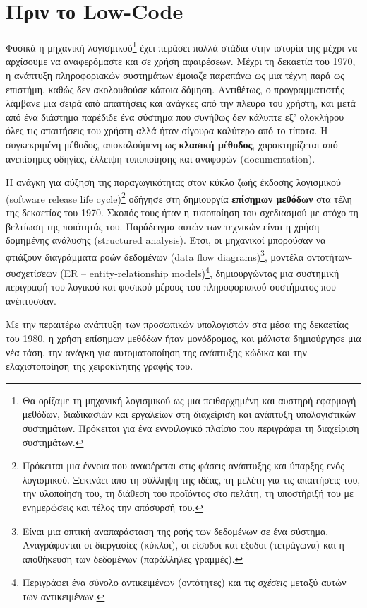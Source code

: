     \section{Πριν το Low-Code}
        Φυσικά η μηχανική λογισμικού\footnote{Θα ορίζαμε τη μηχανική λογισμικού ως μια πειθαρχημένη και αυστηρή εφαρμογή μεθόδων, διαδικασιών και εργαλείων στη διαχείριση και ανάπτυξη υπολογιστικών συστημάτων. Πρόκειται για ένα εννοιλογικό πλαίσιο που περιγράφει τη διαχείριση συστημάτων.} έχει περάσει πολλά στάδια στην ιστορία της μέχρι να αρχίσουμε να αναφερόμαστε και σε χρήση αφαιρέσεων. Μέχρι τη δεκαετία του 1970, η ανάπτυξη πληροφοριακών συστημάτων έμοιαζε παραπάνω ως μια τέχνη παρά ως επιστήμη, καθώς δεν ακολουθούσε κάποια δόμηση. Αντιθέτως, ο προγραμματιστής λάμβανε μια σειρά από απαιτήσεις και ανάγκες από την πλευρά του χρήστη, και μετά από ένα διάστημα παρέδιδε ένα σύστημα που συνήθως δεν κάλυπτε εξ' ολοκλήρου όλες τις απαιτήσεις του χρήστη αλλά ήταν σίγουρα καλύτερο από το τίποτα. Η συγκεκριμένη μέθοδος, αποκαλούμενη ως \textbf{κλασική μέθοδος}, χαρακτηρίζεται από ανεπίσημες οδηγίες, έλλειψη τυποποίησης και αναφορών (documentation).

        Η ανάγκη για αύξηση της παραγωγικότητας στον κύκλο ζωής έκδοσης λογισμικού (software release life cycle)\footnote{Πρόκειται μια έννοια που αναφέρεται στις φάσεις ανάπτυξης και ύπαρξης ενός λογισμικού. Ξεκινάει από τη σύλληψη της ιδέας, τη μελέτη για τις απαιτήσεις του, την υλοποίηση του, τη διάθεση του προϊόντος στο πελάτη, τη υποστήριξή του με ενημερώσεις και τέλος την απόσυρσή του.} οδήγησε στη δημιουργία \textbf{επίσημων μεθόδων} στα τέλη της δεκαετίας του 1970. Σκοπός τους ήταν η τυποποίηση του σχεδιασμού με στόχο τη βελτίωση της ποιότητάς του. Παράδειγμα αυτών των τεχνικών είναι η χρήση δομημένης ανάλυσης (structured analysis). Έτσι, οι μηχανικοί μπορούσαν να φτιάξουν διαγράμματα ροών δεδομένων (data flow diagrams)\footnote{Είναι μια οπτική αναπαράσταση της ροής των δεδομένων σε ένα σύστημα. Αναγράφονται οι διεργασίες (κύκλοι), οι είσοδοι και έξοδοι (τετράγωνα) και η αποθήκευση των δεδομένων (παράλληλες γραμμές).}, μοντέλα οντοτήτων-συσχετίσεων (ER -- entity-relationship models)\footnote{Περιγράφει ένα σύνολο αντικειμένων (οντότητες) και τις \textit{σχέσεις} μεταξύ αυτών των αντικειμένων.}, δημιουργώντας μια συστημική περιγραφή του λογικού και φυσικού μέρους του πληροφοριακού συστήματος που ανέπτυσσαν.

        Με την περαιτέρω ανάπτυξη των προσωπικών υπολογιστών στα μέσα της δεκαετίας του 1980, η χρήση επίσημων μεθόδων ήταν μονόδρομος, και μάλιστα δημιούργησε μια νέα τάση, την ανάγκη για αυτοματοποίηση της ανάπτυξης κώδικα και την ελαχιστοποίηση της χειροκίνητης γραφής του.

